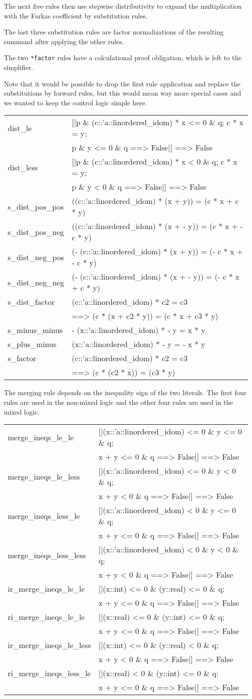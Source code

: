 \documentclass[10pt,a4paper]{article}
\newcommand{\ttt}{\texttt}
\newenvironment{pt}[1]{\begin{center}\begin{tt}\begin{tabular}{#1}\hline}{\end{tabular}\end{tt}\end{center}}
\newcommand{\pl}[1]{#1 \\[1mm]}
\newcommand{\pll}[1]{#1 \\\hline}
\def\ind{\quad}
\begin{document}
The next five rules then use stepwise distributivity to expand the multiplication with the Farkas coefficient by substitution rules.

The last three substitution rules are factor normalizations of the resulting summand after applying the other rules.

The two \ttt{*factor} rules have a calculational proof obligation, which is left to the simplifier.

Note that it would be possible to drop the first rule application and replace the substitutions by forward rules, but this would mean way more special cases and we wanted to keep the control logic simple here.
%
\begin{pt}{ll}
	\pl{dist\_le & [|p \& (c::'a::linordered\_idom) * x <= 0 \& q; c * x = y;}
		\pl{& \ind p \& y <= 0 \& q ==> False|] ==> False}
	\pl{dist\_less & [|p \& (c::'a::linordered\_idom) * x < 0 \& q; c * x = y;}
		\pl{& \ind p \& y < 0 \& q ==> False|] ==> False}
	\pl{s\_dist\_pos\_pos & ((c::'a::linordered\_idom) * (x + y)) = (c * x + c * y)}
	\pl{s\_dist\_pos\_neg & ((c::'a::linordered\_idom) * (x + - y)) = (c * x + - c * y)}
	\pl{s\_dist\_neg\_pos & (- (c::'a::linordered\_idom) * (x + y)) = (- c * x + - c * y)}
	\pl{s\_dist\_neg\_neg & (- (c::'a::linordered\_idom) * (x + - y)) = (- c * x + c * y)}
	\pl{s\_dist\_factor & (c::'a::linordered\_idom) * c2 = c3}
		\pl{& \ind ==> (c * (x + c2 * y)) = (c * x + c3 * y)}
	\pl{s\_minus\_minus & - (x::'a::linordered\_idom) * - y = x * y}
	\pl{s\_plus\_minus & (x::'a::linordered\_idom) * - y = - x * y}
	\pl{s\_factor & (c::'a::linordered\_idom) * c2 = c3}
		\pll{& \ind ==> (c * (c2 * x)) = (c3 * y)}
\end{pt}

The merging rule depends on the inequality sign of the two literals. The first four rules are used in the non-mixed logic and the other four rules are used in the mixed logic.
%
\begin{pt}{ll}
	\pl{merge\_ineqs\_le\_le & [|(x::'a::linordered\_idom) <= 0 \& y <= 0 \& q;}
		\pl{& \ind x + y <= 0 \& q ==> False|] ==> False}
	\pl{merge\_ineqs\_le\_less & [|(x::'a::linordered\_idom) <= 0 \& y < 0 \& q;}
		\pl{& \ind x + y < 0 \& q ==> False|] ==> False}
	\pl{merge\_ineqs\_less\_le & [|(x::'a::linordered\_idom) < 0 \& y <= 0 \& q;}
		\pl{& \ind x + y <= 0 \& q ==> False|] ==> False}
	\pl{merge\_ineqs\_less\_less & [|(x::'a::linordered\_idom) < 0 \& y < 0 \& q;}
		\pl{& \ind x + y < 0 \& q ==> False|] ==> False}
	\pl{ir\_merge\_ineqs\_le\_le & [|(x::int) <= 0 \& (y::real) <= 0 \& q;}
		\pl{& \ind x + y <= 0 \& q ==> False|] ==> False}
	\pl{ri\_merge\_ineqs\_le\_le & [|(x::real) <= 0 \& (y::int) <= 0 \& q;}
		\pl{& \ind x + y <= 0 \& q ==> False|] ==> False}
	\pl{ir\_merge\_ineqs\_le\_less & [|(x::int) <= 0 \& (y::real) < 0 \& q;}
		\pl{& \ind x + y < 0 \& q ==> False|] ==> False}
	\pl{ri\_merge\_ineqs\_less\_le & [|(x::real) < 0 \& (y::int) <= 0 \& q;}
		\pll{& \ind x + y <= 0 \& q ==> False|] ==> False}
\end{pt}
\end{document}
